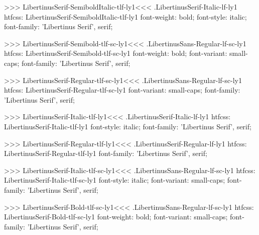 >>>
\<LibertinusSerif-SemiboldItalic-tlf-ly1\><<<
.LibertinusSerif-Italic-lf-ly1
htfcss:  LibertinusSerif-SemiboldItalic-tlf-ly1  font-weight: bold; font-style: italic; font-family: 'Libertinus Serif', serif;

>>>
\<LibertinusSerif-Semibold-tlf-sc-ly1\><<<
.LibertinusSans-Regular-lf-sc-ly1
htfcss:  LibertinusSerif-Semibold-tlf-sc-ly1  font-weight: bold; font-variant: small-caps; font-family: 'Libertinus Serif', serif;

>>>
\<LibertinusSerif-Regular-tlf-sc-ly1\><<<
.LibertinusSans-Regular-lf-sc-ly1
htfcss:  LibertinusSerif-Regular-tlf-sc-ly1  font-variant: small-caps; font-family: 'Libertinus Serif', serif;

>>>
\<LibertinusSerif-Italic-tlf-ly1\><<<
.LibertinusSerif-Italic-lf-ly1
htfcss:  LibertinusSerif-Italic-tlf-ly1  font-style: italic; font-family: 'Libertinus Serif', serif;

>>>
\<LibertinusSerif-Regular-tlf-ly1\><<<
.LibertinusSerif-Regular-lf-ly1
htfcss:  LibertinusSerif-Regular-tlf-ly1  font-family: 'Libertinus Serif', serif;

>>>
\<LibertinusSerif-Italic-tlf-sc-ly1\><<<
.LibertinusSans-Regular-lf-sc-ly1
htfcss:  LibertinusSerif-Italic-tlf-sc-ly1  font-style: italic; font-variant: small-caps; font-family: 'Libertinus Serif', serif;

>>>
\<LibertinusSerif-Bold-tlf-sc-ly1\><<<
.LibertinusSans-Regular-lf-sc-ly1
htfcss:  LibertinusSerif-Bold-tlf-sc-ly1  font-weight: bold; font-variant: small-caps; font-family: 'Libertinus Serif', serif;


